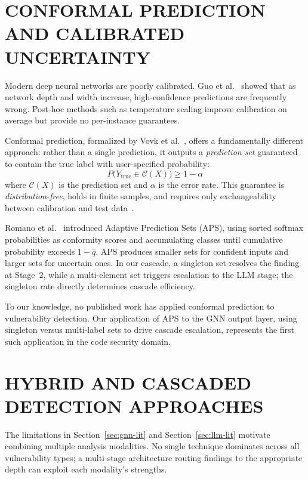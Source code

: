 \section{\uppercase{Conformal Prediction and Calibrated Uncertainty}}
\label{sec:conformal-lit}

Modern deep neural networks are poorly calibrated.
Guo et al.~\cite{guocalibration2017} showed that as network depth and
width increase, high-confidence predictions are frequently wrong.
Post-hoc methods such as temperature scaling improve calibration on
average but provide no per-instance guarantees.

Conformal prediction, formalized by Vovk et al.~\cite{vovk2005}, offers
a fundamentally different approach: rather than a single prediction, it
outputs a \emph{prediction set} guaranteed to contain the true label
with user-specified probability:
%
\begin{equation}
P\bigl(Y_{\text{true}} \in \mathcal{C}(X)\bigr) \geq 1 - \alpha
\label{eq:conformal_guarantee}
\end{equation}
%
\noindent where $\mathcal{C}(X)$ is the prediction set and $\alpha$ is
the error rate. This guarantee is \emph{distribution-free}, holds in
finite samples, and requires only exchangeability between calibration and
test data~\cite{angelopoulos2023}.

Romano et al.~\cite{romano2020} introduced Adaptive Prediction Sets
(APS), using sorted softmax probabilities as conformity scores and
accumulating classes until cumulative probability exceeds $1 - \hat{q}$.
APS produces smaller sets for confident inputs and larger sets for
uncertain ones. In our cascade, a singleton set resolves the finding at
Stage~2, while a multi-element set triggers escalation to the LLM stage;
the singleton rate directly determines cascade efficiency.

To our knowledge, no published work has applied conformal prediction to
vulnerability detection. Our application of APS to the GNN output layer,
using singleton versus multi-label sets to drive cascade escalation,
represents the first such application in the code security domain.

\section{\uppercase{Hybrid and Cascaded\\Detection Approaches}}
\label{sec:hybrid-lit}

The limitations in Section~\ref{sec:gnn-lit} and Section~\ref{sec:llm-lit} motivate
combining multiple analysis modalities. No single technique dominates
across all vulnerability types; a multi-stage architecture routing
findings to the appropriate depth can exploit each modality's strengths.

